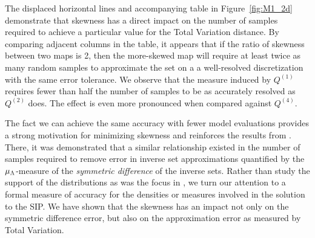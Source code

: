 The displaced horizontal lines and accompanying table in Figure~\ref{fig:M1_2d} demonstrate that skewness has a direct impact on the number of samples required to achieve a particular value for the Total Variation distance.
By comparing adjacent columns in the table, it appears that if the ratio of skewness between two maps is 2, then the more-skewed map will require at least twice as many random samples to approximate the set on a a well-resolved discretization with the same error tolerance.
We observe that the measure induced by $Q^{(1)}$ requires fewer than half the number of samples to be as accurately resolved as $Q^{(2)}$ does.
The effect is even more pronounced when compared against $Q^{(4)}$.

The fact we can achieve the same accuracy with fewer model evaluations provides a strong motivation for minimizing skewness and reinforces the results from \cite{BPW_2015}.
There, it was demonstrated that a similar relationship existed in the number of samples required to remove error in inverse set approximations quantified by the $\mu_{\Lambda}$-measure of the {\em symmetric difference} of the inverse sets.
Rather than study the support of the distributions as was the focus in \cite{BPW_2015}, we turn our attention to a formal measure of accuracy for the densities or measures involved in the solution to the SIP.
We have shown that the skewness has an impact not only on the symmetric difference error, but also on the approximation error as measured by Total Variation.
